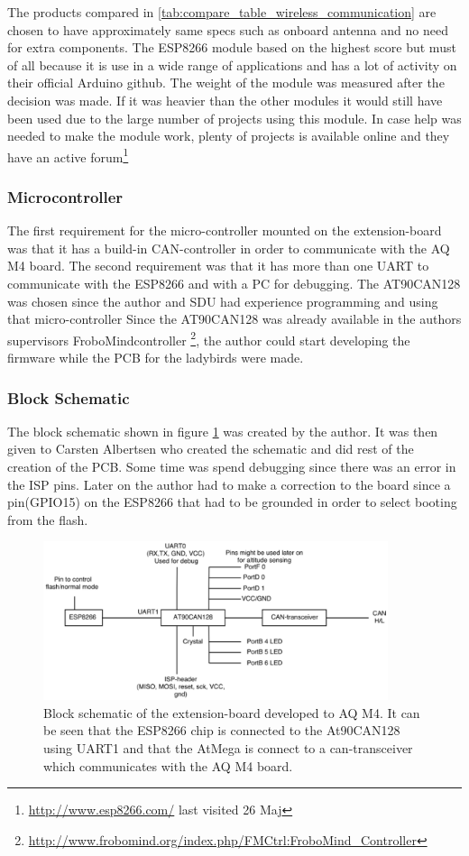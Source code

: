 The products compared in \ref{tab:compare_table_wireless_communication} are chosen to have approximately same specs such as onboard antenna and no need for extra components.
The ESP8266 module based on the highest score but must of all because it is use in a wide range of applications and has a lot of activity on their official Arduino github. The weight of the module was measured after the decision was made. If it was heavier than the other modules it would still have been used due to the large number of projects using this module. In case help was needed to make the module work, plenty of projects is available online and they have an active forum\footnote{\url{http://www.esp8266.com/} last visited 26 Maj}

\subsubsection{Microcontroller}
The first requirement for the micro-controller mounted on the extension-board was that it has a build-in CAN-controller in order to communicate with the AQ M4 board. 
The second requirement was that it has more than one UART to communicate with the ESP8266 and with a PC for debugging. 
The AT90CAN128 was chosen since the author and SDU had experience programming and using that micro-controller
Since the AT90CAN128 was already available in the authors supervisors FroboMindcontroller \footnote{\url{http://www.frobomind.org/index.php/FMCtrl:FroboMind\_Controller}}, the author could start developing the firmware while the PCB for the ladybirds were made.

\subsubsection{Block Schematic}
The block schematic shown in figure \ref{fig:PCB_block} was created by the author. It was then given to Carsten Albertsen who created the schematic and did rest of the creation of the PCB. Some time was spend  debugging since there was an error in the ISP pins. Later on the author had to make a correction to the board since a pin(GPIO15) on the ESP8266 that had to be grounded in order to select booting from the flash.
\begin{figure}[H]
    \center
    \includegraphics[width=0.9\textwidth]{graphics/PCB_block_v3.eps}
    \caption{Block schematic of the extension-board developed to AQ M4. It can be seen that the ESP8266 chip is connected to the At90CAN128 using UART1 and that the AtMega is connect to a can-transceiver which  communicates with the AQ M4 board.}
    \label{fig:PCB_block}
\end{figure}

